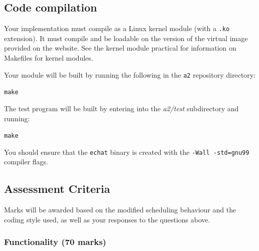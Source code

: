 \documentclass[12pt,a4paper]{article}
\begin{document}
\subsection*{Code compilation}

Your implementation must compile as a Linux kernel module (with a \texttt{.ko}
extension). It must compile and be loadable on the version of the virtual image
provided on the website. See the kernel module practical for information on
Makefiles for kernel modules.

Your module will be built by running the following in the \texttt{a2}
repository directory:

\texttt{make}

The test program will be built by entering into the \textit{a2/test}
subdirectory and running:

\texttt{make}

You should ensure that the \texttt{echat} binary is created with the
\texttt{-Wall -std=gnu99} compiler flags.







\clearpage
\subsection*{Assessment Criteria}

Marks will be awarded based on the modified scheduling behaviour and the coding
style used, as well as your responses to the questions above.

\subsubsection*{Functionality (70 marks)}
\end{document}

